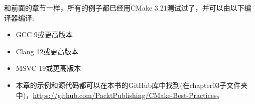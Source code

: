 
和前面的章节一样，所有的例子都已经用CMake 3.21测试过了，并可以由以下编译器编译:

\begin{itemize}
\item 
GCC 9或更高版本

\item 
Clang 12或更高版本

\item 
MSVC 19或更高版本

\item 
本章的示例和源代码都可以在本书的GitHub库中找到(在chapter03子文件夹中)，\url{https://github.com/PacktPublishing/CMake-Best-Practices}。
\end{itemize}